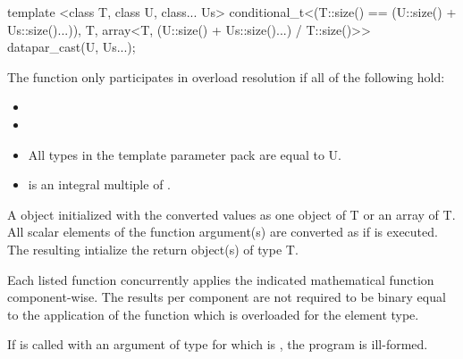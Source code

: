 \begin{itemdecl}
template <class T, class U, class... Us>
conditional_t<(T::size() == (U::size() + Us::size()...)), T,
            array<T, (U::size() + Us::size()...) / T::size()>> datapar_cast(U, Us...);
\end{itemdecl}
\begin{itemdescr}
  \pnum\remarks The  function only participates in overload resolution if all of the following hold:
  \begin{itemize}
    \item {}
    \item {}
    \item All types in the template parameter pack  are equal to \type U.
    \item {} is an integral multiple of .
  \end{itemize}

  \pnum\returns A \datapar object initialized with the converted values as one object of \type T or an array of \type T.
  All scalar elements  of the function argument(s) are converted as if
   is executed.
  The resulting  intialize the return object(s) of type \type T.
\end{itemdescr}



\pnum Each listed function concurrently applies the indicated mathematical function component-wise.
The results per component are not required to be binary equal to the application of the function which is overloaded for the element type.

\pnum If  is called with an argument of type \datapar[<X, Abi>] for which  is \true, the program is ill-formed.

